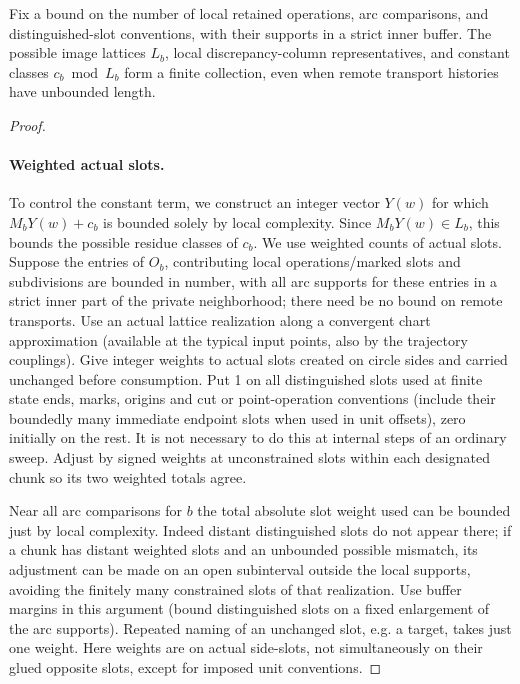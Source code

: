 \begin{lemma}\label{kern:finite-lattice-types}
Fix a bound on the number of local retained operations, arc comparisons, and distinguished-slot
conventions, with their supports in a strict inner buffer. The possible image lattices \(L_b\),
local discrepancy-column representatives, and constant classes \(c_b\bmod L_b\) form a finite
collection, even when remote transport histories have unbounded length.
\end{lemma}
\begin{proof}\leavevmode

\paragraph{Weighted actual slots.}

To control the constant term, we construct an integer vector $Y(w)$ for which
$M_bY(w)+c_b$ is bounded solely by local complexity. Since $M_bY(w)\in L_b$,
this bounds the possible residue classes of $c_b$. We use weighted counts of
actual slots. Suppose the entries of \(O_b\),
contributing local operations/marked slots and subdivisions are bounded in number, with all arc supports for
these entries in a strict inner part of the private neighborhood; there need be no bound on remote
transports. Use an actual lattice realization along a convergent chart approximation (available at the
typical input points, also by the trajectory couplings). Give integer weights to actual slots created on
circle sides and carried unchanged before consumption. Put 1 on all distinguished slots used at finite state
ends, marks, origins and cut or point-operation conventions (include their boundedly many immediate endpoint
slots when used in unit offsets), zero initially on the rest. It is not necessary to do this at internal
steps of an ordinary sweep. Adjust by signed weights at unconstrained slots within each designated chunk so
its two weighted totals agree.

Near all arc comparisons for \(b\) the total absolute slot weight used can be
bounded just by local complexity. Indeed distant distinguished slots do not appear there; if a chunk has
distant weighted slots and an unbounded possible mismatch, its adjustment can be made on an open subinterval
outside the local supports, avoiding the finitely many constrained slots of that realization. Use buffer
margins in this argument (bound distinguished slots on a fixed enlargement of the arc supports). Repeated
naming of an unchanged slot, e.g. a target, takes just one weight. Here weights are on actual side-slots,
not simultaneously on their glued opposite slots, except for imposed unit conventions.


\end{proof}
